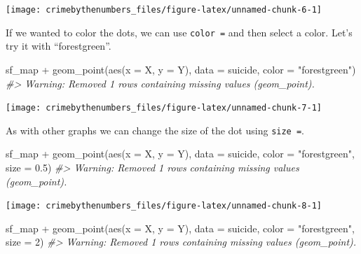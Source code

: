 \documentclass[
  12pt,
]{book}
\newenvironment{Shaded}{\begin{snugshade}}{\end{snugshade}}
\newcommand{\AttributeTok}[1]{\textcolor[rgb]{0.61,0.61,0.61}{#1}}
\newcommand{\CommentTok}[1]{\textcolor[rgb]{0.37,0.37,0.37}{\textit{#1}}}
\newcommand{\DecValTok}[1]{\textcolor[rgb]{0.06,0.06,0.06}{#1}}
\newcommand{\FloatTok}[1]{\textcolor[rgb]{0.06,0.06,0.06}{#1}}
\newcommand{\FunctionTok}[1]{\textcolor[rgb]{0,0,0}{#1}}
\newcommand{\NormalTok}[1]{#1}
\newcommand{\SpecialCharTok}[1]{\textcolor[rgb]{0,0,0}{#1}}
\newcommand{\StringTok}[1]{\textcolor[rgb]{0.5,0.5,0.5}{#1}}
\begin{document}
\begin{center}\texttt{[image: crimebythenumbers\_files/figure-latex/unnamed-chunk-6-1]} \end{center}

If we wanted to color the dots, we can use \texttt{color\ =} and then select a color. Let's try it with ``forestgreen''.

\begin{Shaded}
\begin{Highlighting}[]
\NormalTok{sf\_map }\SpecialCharTok{+}
  \FunctionTok{geom\_point}\NormalTok{(}\FunctionTok{aes}\NormalTok{(}\AttributeTok{x =}\NormalTok{ X, }\AttributeTok{y =}\NormalTok{ Y),}
             \AttributeTok{data  =}\NormalTok{ suicide,}
             \AttributeTok{color =} \StringTok{"forestgreen"}\NormalTok{)}
\CommentTok{\#\textgreater{} Warning: Removed 1 rows containing missing values (geom\_point).}
\end{Highlighting}
\end{Shaded}

\begin{center}\texttt{[image: crimebythenumbers\_files/figure-latex/unnamed-chunk-7-1]} \end{center}

As with other graphs we can change the size of the dot using \texttt{size\ =}.

\begin{Shaded}
\begin{Highlighting}[]
\NormalTok{sf\_map }\SpecialCharTok{+}
  \FunctionTok{geom\_point}\NormalTok{(}\FunctionTok{aes}\NormalTok{(}\AttributeTok{x =}\NormalTok{ X, }\AttributeTok{y =}\NormalTok{ Y),}
             \AttributeTok{data  =}\NormalTok{ suicide,}
             \AttributeTok{color =} \StringTok{"forestgreen"}\NormalTok{,}
             \AttributeTok{size  =} \FloatTok{0.5}\NormalTok{)}
\CommentTok{\#\textgreater{} Warning: Removed 1 rows containing missing values (geom\_point).}
\end{Highlighting}
\end{Shaded}

\begin{center}\texttt{[image: crimebythenumbers\_files/figure-latex/unnamed-chunk-8-1]} \end{center}

\begin{Shaded}
\begin{Highlighting}[]
\NormalTok{sf\_map }\SpecialCharTok{+}
  \FunctionTok{geom\_point}\NormalTok{(}\FunctionTok{aes}\NormalTok{(}\AttributeTok{x =}\NormalTok{ X, }\AttributeTok{y =}\NormalTok{ Y),}
             \AttributeTok{data  =}\NormalTok{ suicide,}
             \AttributeTok{color =} \StringTok{"forestgreen"}\NormalTok{,}
             \AttributeTok{size  =} \DecValTok{2}\NormalTok{)}
\CommentTok{\#\textgreater{} Warning: Removed 1 rows containing missing values (geom\_point).}
\end{Highlighting}
\end{Shaded}
\end{document}
